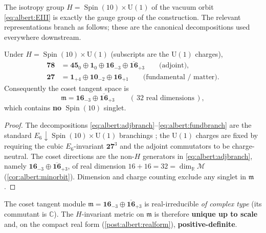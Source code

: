 The isotropy group $H=\operatorname{Spin}(10)\times\mathrm{U}(1)$ of the
vacuum orbit \eqref{eq:albert:EIII} is exactly the gauge group of the
construction. The relevant representations branch as follows; these are
the canonical decompositions used everywhere downstream.

\begin{theorem}\label{thm:albert:branchings}
Under $H=\operatorname{Spin}(10)\times\mathrm{U}(1)$ (subscripts are the
$\mathrm{U}(1)$ charges),
\begin{align}
  \mathbf{78}
   &= \mathbf{45}_{0}\oplus\mathbf{1}_{0}
      \oplus\mathbf{16}_{-3}\oplus\overline{\mathbf{16}}_{+3}
      \qquad\text{(adjoint),}
   \label{eq:albert:adjbranch}\\[2pt]
  \mathbf{27}
   &= \mathbf{1}_{+4}\oplus\mathbf{10}_{-2}\oplus\mathbf{16}_{+1}
      \qquad\text{(fundamental / matter).}
   \label{eq:albert:fundbranch}
\end{align}
Consequently the coset tangent space is
\begin{equation}\label{eq:albert:cosettangent}
  \mathfrak{m}
   = \mathbf{16}_{-3}\oplus\overline{\mathbf{16}}_{+3}
   \qquad(\,32\text{ real dimensions}\,),
\end{equation}
which contains \textbf{no} $\operatorname{Spin}(10)$ singlet.
\end{theorem}

\begin{proof}
The decompositions \eqref{eq:albert:adjbranch}--\eqref{eq:albert:fundbranch}
are the standard $E_{6}\downarrow\operatorname{Spin}(10)\times\mathrm{U}(1)$
branchings \cite{Slansky:1981}; the $\mathrm{U}(1)$ charges are fixed by
requiring the cubic $E_{6}$-invariant $\mathbf{27}^{3}$ and the adjoint
commutators to be charge-neutral. The coset directions are the
non-$H$ generators in \eqref{eq:albert:adjbranch}, namely
$\mathbf{16}_{-3}\oplus\overline{\mathbf{16}}_{+3}$, of real dimension
$16+16=32=\dim_{\mathbb{R}}\mathcal{M}$ (\autoref{cor:albert:minorbit}).
Dimension and charge counting exclude any singlet in $\mathfrak{m}$.
\end{proof}

\begin{theorem}\label{thm:albert:irrep}
The coset tangent module $\mathfrak{m}=\mathbf{16}_{-3}\oplus
\overline{\mathbf{16}}_{+3}$ is real-irreducible \emph{of complex type}
(its commutant is $\mathbb{C}$). The $H$-invariant metric on
$\mathfrak{m}$ is therefore \textbf{unique up to scale} and, on the
compact real form (\autoref{post:albert:realform}),
\textbf{positive-definite}.
\end{theorem}

